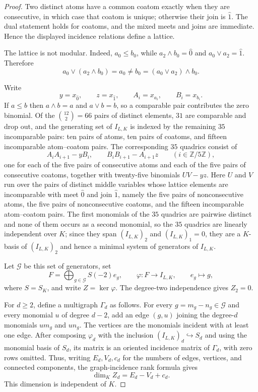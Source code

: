 \documentclass[11pt]{amsart}
\begin{document}
\begin{proof}
Two distinct atoms have a common coatom exactly when they are
consecutive, in which case that coatom is unique; otherwise their join
is $\widehat 1$. The dual statement holds for coatoms, and the mixed
meets and joins are immediate. Hence the displayed incidence relations
define a lattice.

The lattice is not modular. Indeed, $a_0\le b_0$, while
$a_2\wedge b_0=\widehat0$ and $a_0\vee a_2=\widehat1$. Therefore
\[
  a_0\vee(a_2\wedge b_0)=a_0
  \neq
  b_0=(a_0\vee a_2)\wedge b_0.
\]

Write
\[
  y=x_{\widehat0},\qquad z=x_{\widehat1},\qquad
  A_i=x_{a_i},\qquad B_i=x_{b_i}.
\]
If $a\le b$ then $a\wedge b=a$ and $a\vee b=b$, so a comparable pair
contributes the zero binomial. Of the $\binom{12}{2}=66$ pairs of
distinct elements, $31$ are comparable and drop out, and the generating
set of $I_{L,K}$ is indexed by the remaining $35$ incomparable pairs:
ten pairs of atoms, ten pairs of coatoms, and fifteen incomparable
atom--coatom pairs. The corresponding $35$ quadrics consist of
\[
  A_iA_{i+1}-yB_i,
  \qquad
  B_iB_{i+1}-A_{i+1}z
  \qquad(i\in\mathbb Z/5\mathbb Z),
\]
one for each of the five pairs of consecutive atoms and each of the five
pairs of consecutive coatoms, together with twenty-five binomials
$UV-yz$. Here $U$ and $V$ run over the pairs of distinct middle
variables whose lattice elements are incomparable with meet $\widehat0$
and join $\widehat1$, namely the five pairs of nonconsecutive atoms, the
five pairs of nonconsecutive coatoms, and the fifteen incomparable
atom--coatom pairs. The first monomials of the $35$ quadrics are
pairwise distinct and none of them occurs as a second monomial, so the
$35$ quadrics are linearly independent over $K$; since they span
$(I_{L,K})_2$ and $(I_{L,K})_1=0$, they are a $K$-basis of
$(I_{L,K})_2$ and hence a minimal system of generators of $I_{L,K}$.

Let $\mathcal G$ be this set of generators, set
\[
  F=\bigoplus_{g\in\mathcal G}S(-2)e_g,
  \qquad
  \varphi:F\longrightarrow I_{L,K},
  \qquad
  e_g\longmapsto g,
\]
where $S=S_K$, and write $Z=\ker\varphi$. The degree-two
independence gives $Z_2=0$.

For $d\ge2$, define a multigraph $\Gamma_d$ as follows. For every
$g=m_g-n_g\in\mathcal G$ and every monomial $u$ of degree $d-2$, add
an edge $(g,u)$ joining the degree-$d$ monomials $um_g$ and $un_g$.
The vertices are the monomials incident with at least one edge. After
composing $\varphi_d$ with the inclusion $(I_{L,K})_d\hookrightarrow
S_d$ and using the monomial basis of $S_d$, its matrix is an oriented
incidence matrix of $\Gamma_d$, with zero rows omitted. Thus, writing
$E_d,V_d,c_d$ for the numbers of edges, vertices, and connected
components, the graph-incidence rank formula gives
\[
  \dim_K Z_d=E_d-V_d+c_d.
\]
This dimension is independent of $K$.


\end{proof}
\end{document}
